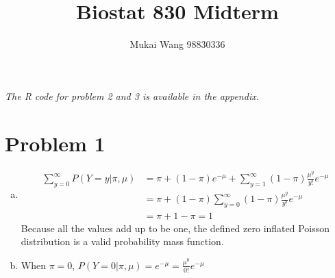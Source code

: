 \documentclass[12pt]{article}
\title{Biostat 830 Midterm}
\date{}
\author{Mukai Wang 98830336}
\begin{document}
\maketitle

\emph{The R code for problem 2 and 3 is available in the appendix.}
\section*{Problem 1}

\begin{enumerate}[(a)]
	\item 
	\begin{align*}
		\sum_{y=0}^{\infty}P\left(\left.Y=y \right\vert \pi, \mu\right) &= \pi + (1-\pi) e^{-\mu} + \sum_{y=1}^{\infty}(1-\pi)\frac{\mu^{y}}{y!}e^{-\mu}\\
		&= \pi + (1-\pi)\sum_{y=0}^{\infty}(1-\pi)\frac{\mu^{y}}{y!}e^{-\mu}\\
		&=\pi+1-\pi=1
	\end{align*}
	Because all the values add up to be one, the defined zero inflated Poisson distribution is a valid probability mass function.
	
	\item When $\pi=0$, 
	$P\left(\left.Y=0 \right\vert \pi, \mu\right) = e^{-\mu} = \frac{\mu^{0}}{0!}e^{-\mu}$
	

\end{enumerate}
\end{document}
